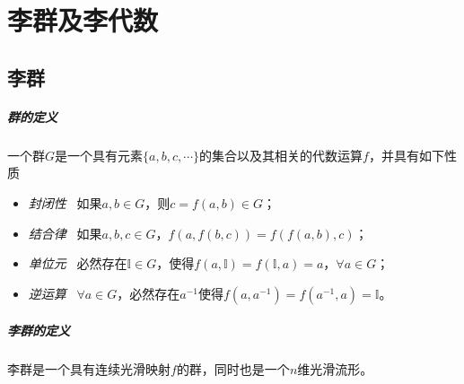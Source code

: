 \appendix
\chapter{李群及李代数}
\section{李群}
\paragraph{群的定义} 一个群$G$是一个具有元素$\{a,b,c,\cdots\}$的集合以及其相关的代数运算$f$，并具有如下性质
\begin{itemize}
    \item \textit{封闭性} ~如果$a,b\in G$，则$c=f(a,b)\in G$；
    \item \textit{结合律} ~如果$a,b,c\in G$，$f(a, f(b,c)) = f(f(a,b),c)$；
    \item \textit{单位元} ~必然存在$\mathbb{I}\in G $，使得$f(a,\mathbb{I}) = f(\mathbb{I},a) = a$，$\forall a\in G$；
    \item \textit{逆运算} ~$\forall a \in G$，必然存在$a^{-1}$使得$f(a,a^{-1}) = f(a^{-1}, a) = \mathbb{I}$。
\end{itemize}

\paragraph{李群的定义} 李群是一个具有连续光滑映射$f$的群，同时也是一个$n$维光滑流形。

